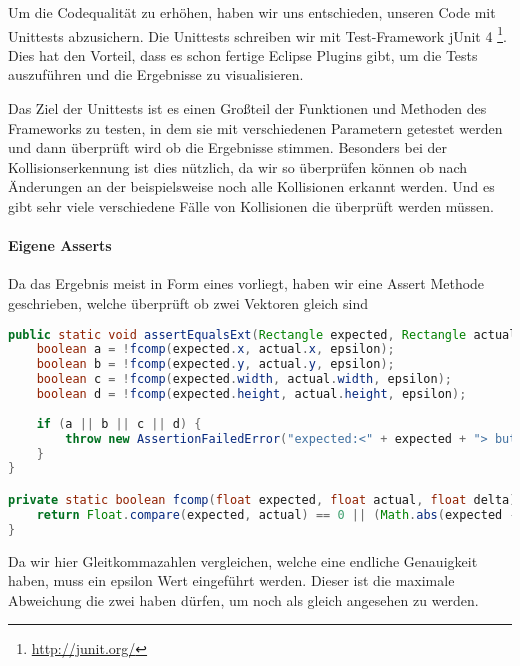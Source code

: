 
Um die Codequalität zu erhöhen, haben wir uns entschieden, unseren Code mit Unittests abzusichern.
Die Unittests schreiben wir mit Test-Framework jUnit 4 \footnote{\url{http://junit.org/}}. Dies hat den Vorteil, dass es schon fertige Eclipse Plugins gibt, um die Tests auszuführen und die Ergebnisse zu visualisieren.


Das Ziel der Unittests ist es einen Großteil der Funktionen und Methoden des Frameworks zu testen, in dem sie mit verschiedenen Parametern getestet werden und dann überprüft wird ob die Ergebnisse stimmen.
Besonders bei der Kollisionserkennung ist dies nützlich, da wir so überprüfen können ob nach Änderungen an der  beispielsweise noch alle Kollisionen erkannt werden. Und es gibt sehr viele verschiedene Fälle von Kollisionen die überprüft werden müssen.

\paragraph{Eigene Asserts}

Da das Ergebnis meist in Form eines  vorliegt, haben wir eine Assert Methode geschrieben, welche überprüft ob zwei Vektoren gleich sind

\doinline
\begin{lstlisting}[caption=Eine Assert Methode für zwe Vektoren, title=\hspace{0 pt}, language=java]
public static void assertEqualsExt(Rectangle expected, Rectangle actual, float epsilon) {
	boolean a = !fcomp(expected.x, actual.x, epsilon);
	boolean b = !fcomp(expected.y, actual.y, epsilon);
	boolean c = !fcomp(expected.width, actual.width, epsilon);
	boolean d = !fcomp(expected.height, actual.height, epsilon);
	
	if (a || b || c || d) {
		throw new AssertionFailedError("expected:<" + expected + "> but was:<" + actual + ">" );
	}
}

private static boolean fcomp(float expected, float actual, float delta) {
	return Float.compare(expected, actual) == 0 || (Math.abs(expected - actual) <= delta);
}
\end{lstlisting}

Da wir hier Gleitkommazahlen vergleichen, welche eine endliche Genauigkeit haben, muss ein epsilon Wert eingeführt werden. Dieser ist die maximale Abweichung die zwei  haben dürfen, um noch als gleich angesehen zu werden.

